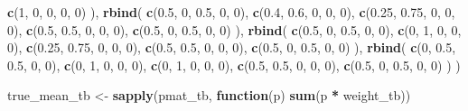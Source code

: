 \documentclass[
  chinese,
]{article}
\newenvironment{Shaded}{\begin{snugshade}}{\end{snugshade}}
\newcommand{\ControlFlowTok}[1]{\textcolor[rgb]{0.13,0.29,0.53}{\textbf{#1}}}
\newcommand{\DecValTok}[1]{\textcolor[rgb]{0.00,0.00,0.81}{#1}}
\newcommand{\FloatTok}[1]{\textcolor[rgb]{0.00,0.00,0.81}{#1}}
\newcommand{\FunctionTok}[1]{\textcolor[rgb]{0.13,0.29,0.53}{\textbf{#1}}}
\newcommand{\NormalTok}[1]{#1}
\newcommand{\OtherTok}[1]{\textcolor[rgb]{0.56,0.35,0.01}{#1}}
\newcommand{\SpecialCharTok}[1]{\textcolor[rgb]{0.81,0.36,0.00}{\textbf{#1}}}
\begin{document}
\begin{Shaded}
\begin{Highlighting}[]
    \FunctionTok{c}\NormalTok{(}\DecValTok{1}\NormalTok{, }\DecValTok{0}\NormalTok{, }\DecValTok{0}\NormalTok{, }\DecValTok{0}\NormalTok{, }\DecValTok{0}\NormalTok{)}
\NormalTok{  ),}
  \FunctionTok{rbind}\NormalTok{(}
    \FunctionTok{c}\NormalTok{(}\FloatTok{0.5}\NormalTok{, }\DecValTok{0}\NormalTok{, }\FloatTok{0.5}\NormalTok{, }\DecValTok{0}\NormalTok{, }\DecValTok{0}\NormalTok{),}
    \FunctionTok{c}\NormalTok{(}\FloatTok{0.4}\NormalTok{, }\FloatTok{0.6}\NormalTok{, }\DecValTok{0}\NormalTok{, }\DecValTok{0}\NormalTok{, }\DecValTok{0}\NormalTok{),}
    \FunctionTok{c}\NormalTok{(}\FloatTok{0.25}\NormalTok{, }\FloatTok{0.75}\NormalTok{, }\DecValTok{0}\NormalTok{, }\DecValTok{0}\NormalTok{, }\DecValTok{0}\NormalTok{),}
    \FunctionTok{c}\NormalTok{(}\FloatTok{0.5}\NormalTok{, }\FloatTok{0.5}\NormalTok{, }\DecValTok{0}\NormalTok{, }\DecValTok{0}\NormalTok{, }\DecValTok{0}\NormalTok{),}
    \FunctionTok{c}\NormalTok{(}\FloatTok{0.5}\NormalTok{, }\DecValTok{0}\NormalTok{, }\FloatTok{0.5}\NormalTok{, }\DecValTok{0}\NormalTok{, }\DecValTok{0}\NormalTok{)}
\NormalTok{  ),}
  \FunctionTok{rbind}\NormalTok{(}
    \FunctionTok{c}\NormalTok{(}\FloatTok{0.5}\NormalTok{, }\DecValTok{0}\NormalTok{, }\FloatTok{0.5}\NormalTok{, }\DecValTok{0}\NormalTok{, }\DecValTok{0}\NormalTok{),}
    \FunctionTok{c}\NormalTok{(}\DecValTok{0}\NormalTok{, }\DecValTok{1}\NormalTok{, }\DecValTok{0}\NormalTok{, }\DecValTok{0}\NormalTok{, }\DecValTok{0}\NormalTok{),}
    \FunctionTok{c}\NormalTok{(}\FloatTok{0.25}\NormalTok{, }\FloatTok{0.75}\NormalTok{, }\DecValTok{0}\NormalTok{, }\DecValTok{0}\NormalTok{, }\DecValTok{0}\NormalTok{),}
    \FunctionTok{c}\NormalTok{(}\FloatTok{0.5}\NormalTok{, }\FloatTok{0.5}\NormalTok{, }\DecValTok{0}\NormalTok{, }\DecValTok{0}\NormalTok{, }\DecValTok{0}\NormalTok{),}
    \FunctionTok{c}\NormalTok{(}\FloatTok{0.5}\NormalTok{, }\DecValTok{0}\NormalTok{, }\FloatTok{0.5}\NormalTok{, }\DecValTok{0}\NormalTok{, }\DecValTok{0}\NormalTok{)}
\NormalTok{  ),}
  \FunctionTok{rbind}\NormalTok{(}
    \FunctionTok{c}\NormalTok{(}\DecValTok{0}\NormalTok{, }\FloatTok{0.5}\NormalTok{, }\FloatTok{0.5}\NormalTok{, }\DecValTok{0}\NormalTok{, }\DecValTok{0}\NormalTok{),}
    \FunctionTok{c}\NormalTok{(}\DecValTok{0}\NormalTok{, }\DecValTok{1}\NormalTok{, }\DecValTok{0}\NormalTok{, }\DecValTok{0}\NormalTok{, }\DecValTok{0}\NormalTok{),}
    \FunctionTok{c}\NormalTok{(}\DecValTok{0}\NormalTok{, }\DecValTok{1}\NormalTok{, }\DecValTok{0}\NormalTok{, }\DecValTok{0}\NormalTok{, }\DecValTok{0}\NormalTok{),}
    \FunctionTok{c}\NormalTok{(}\FloatTok{0.5}\NormalTok{, }\FloatTok{0.5}\NormalTok{, }\DecValTok{0}\NormalTok{, }\DecValTok{0}\NormalTok{, }\DecValTok{0}\NormalTok{),}
    \FunctionTok{c}\NormalTok{(}\FloatTok{0.5}\NormalTok{, }\DecValTok{0}\NormalTok{, }\FloatTok{0.5}\NormalTok{, }\DecValTok{0}\NormalTok{, }\DecValTok{0}\NormalTok{)}
\NormalTok{  )}
\NormalTok{)}

\NormalTok{true\_mean\_tb }\OtherTok{\textless{}{-}} \FunctionTok{sapply}\NormalTok{(pmat\_tb, }\ControlFlowTok{function}\NormalTok{(p) }\FunctionTok{sum}\NormalTok{(p }\SpecialCharTok{*}\NormalTok{ weight\_tb))}
\end{Highlighting}
\end{Shaded}
\end{document}
